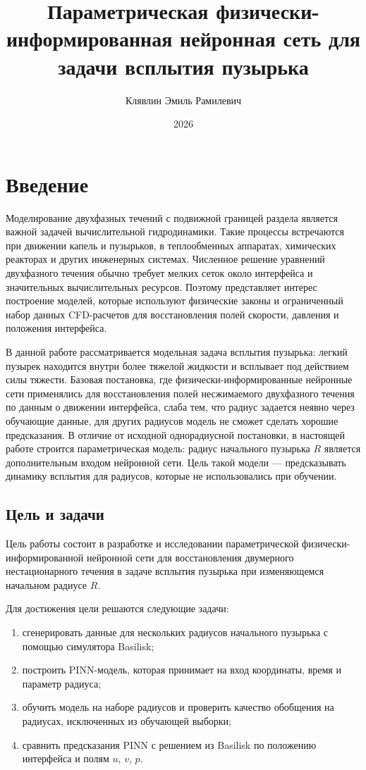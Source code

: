 \documentclass[12pt,a4paper]{article}
\title{Параметрическая физически-информированная нейронная сеть для задачи всплытия пузырька}
\author{Клявлин Эмиль Рамилевич}
\date{2026}
\begin{document}
\maketitle

\section{Введение}

Моделирование двухфазных течений с подвижной границей раздела является важной
задачей вычислительной гидродинамики. Такие процессы встречаются при движении
капель и пузырьков, в теплообменных аппаратах, химических реакторах и других
инженерных системах. Численное решение уравнений двухфазного течения обычно
требует мелких сеток около интерфейса и значительных вычислительных ресурсов.
Поэтому представляет интерес построение моделей, которые используют физические
законы и ограниченный набор данных CFD-расчетов для восстановления полей
скорости, давления и положения интерфейса.

В данной работе рассматривается модельная задача всплытия пузырька: легкий
пузырек находится внутри более тяжелой жидкости и всплывает под действием силы
тяжести. Базовая постановка, где физически-информированные нейронные сети применялись
для восстановления полей несжимаемого двухфазного течения по данным о движении
интерфейса, слаба тем, что радиус задается неявно через обучающие данные, для других радиусов модель не сможет сделать хорошие предсказания. В отличие от исходной однорадиусной постановки, в настоящей работе
строится параметрическая модель: радиус начального пузырька \(R\) является
дополнительным входом нейронной сети. Цель такой модели --- предсказывать
динамику всплытия для радиусов, которые не использовались при обучении.

\subsection{Цель и задачи}

Цель работы состоит в разработке и исследовании параметрической
физически-информированной нейронной сети для восстановления двумерного
нестационарного течения в задаче всплытия пузырька при изменяющемся начальном
радиусе \(R\).

Для достижения цели решаются следующие задачи:
\begin{enumerate}
    \item сгенерировать данные для нескольких радиусов начального пузырька
    с помощью симулятора Basilisk;
    \item построить PINN-модель, которая принимает на вход координаты, время и
    параметр радиуса;
    \item обучить модель на наборе радиусов и проверить качество обобщения на
    радиусах, исключенных из обучающей выборки;
    \item сравнить предсказания PINN с решением из Basilisk по положению интерфейса и
    полям \(u\), \(v\), \(p\).
\end{enumerate}
\end{document}
